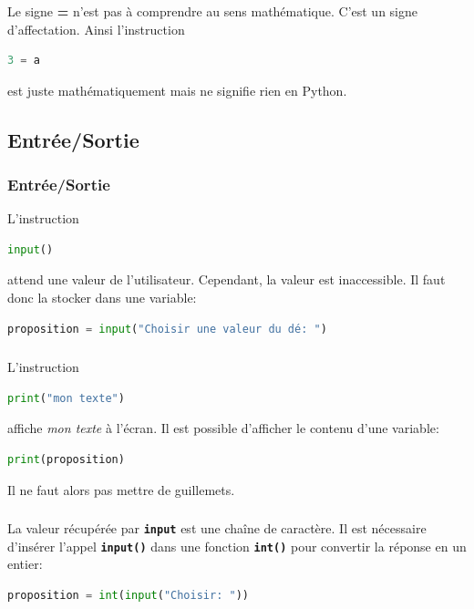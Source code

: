 \documentclass[svgnames,11pt]{beamer}
\begin{document}
\begin{frame}[fragile]
    \frametitle{}


    \begin{aretenir}[Remarque]
        Le signe \textbf{=} n'est pas à comprendre au sens mathématique. C'est un signe d'affectation. Ainsi l'instruction
        \begin{lstlisting}[language=Python , basicstyle=\ttfamily\small, xleftmargin=2em, xrightmargin=2em]
3 = a
\end{lstlisting}
        est juste mathématiquement mais ne signifie rien en Python.
    \end{aretenir}

\end{frame}
\subsection{Entrée/Sortie}
\begin{frame}[fragile]
    \frametitle{Entrée/Sortie}

    L'instruction
    \begin{lstlisting}[language=Python , basicstyle=\ttfamily\small, xleftmargin=2em, xrightmargin=2em]
input()
\end{lstlisting}
    attend une valeur de l'utilisateur. Cependant, la valeur est inaccessible. Il faut donc la stocker dans une variable:
    \begin{lstlisting}[language=Python , basicstyle=\ttfamily\small, xleftmargin=1em, xrightmargin=1em]
proposition = input("Choisir une valeur du dé: ")
\end{lstlisting}


\end{frame}
\begin{frame}[fragile]
    \frametitle{}

    L'instruction
    \begin{lstlisting}[language=Python , basicstyle=\ttfamily\small, xleftmargin=2em, xrightmargin=2em]
print("mon texte")
\end{lstlisting}
    affiche \emph{mon texte} à l'écran. Il est possible d'afficher le contenu d'une variable:
    \begin{lstlisting}[language=Python , basicstyle=\ttfamily\small, xleftmargin=2em, xrightmargin=2em]
print(proposition)
\end{lstlisting}
    Il ne faut alors pas mettre de guillemets.

\end{frame}
\begin{frame}[fragile]
    \frametitle{}

    \begin{aretenir}[Remarque]
        La valeur récupérée par \textbf{\texttt{input}} est une chaîne de caractère. Il est nécessaire d’insérer l’appel \texttt{\textbf{input()}} dans une fonction \texttt{\textbf{int()}} pour convertir la réponse en un entier:
        \begin{lstlisting}[language=Python , basicstyle=\ttfamily\small, xleftmargin=1em, xrightmargin=1em]
proposition = int(input("Choisir: "))
\end{lstlisting}
    \end{aretenir}

\end{frame}
\end{document}
